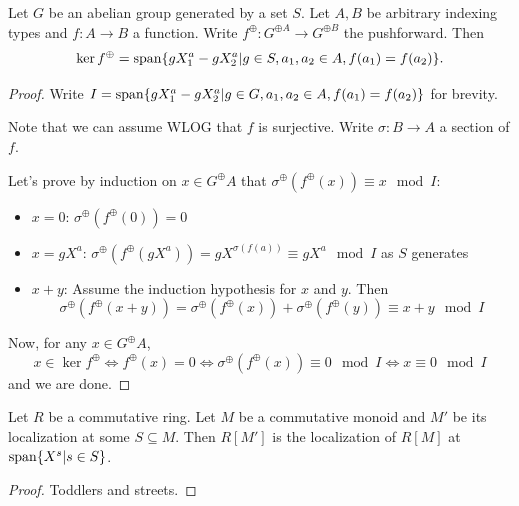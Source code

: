 \begin{proposition}
  \label{0-ker-mon-alg}
  \uses{}

  Let $G$ be an abelian group generated by a set $S$.
  Let $A, B$ be arbitrary indexing types and $f : A \to B$ a function.
  Write $f^\oplus : G^{\oplus A} \to G^{\oplus B}$ the pushforward.
  Then
  \[
    \ker f^\oplus = \operatorname{span}\{gX^a_1 - gX^a_2 | g \in S, a_1, a_2 \in A, f(a_1) = f(a_2)\}.
  \]
\end{proposition}
\begin{proof}
  \uses{}

  Write $I = \operatorname{span}\{gX^a_1 - gX^a_2 | g \in G, a_1, a_2 \in A, f(a_1) = f(a_2)\}$ for brevity.

  Note that we can assume WLOG that $f$ is surjective.
  Write $\sigma : B \to A$ a section of $f$.

  Let's prove by induction on $x \in G^\oplus A$ that $\sigma^\oplus(f^\oplus(x)) \equiv x \mod I$:
  \begin{itemize}
    \item $x = 0$: $\sigma^\oplus(f^\oplus(0)) = 0$
    \item $x = gX^a$:
      $\sigma^\oplus(f^\oplus(gX^a)) = gX^{\sigma(f(a))} \equiv gX^a \mod I$ as $S$ generates
    \item $x + y$: Assume the induction hypothesis for $x$ and $y$. Then
      \[
        \sigma^\oplus(f^\oplus(x + y)) = \sigma^\oplus(f^\oplus(x)) + \sigma^\oplus(f^\oplus(y))
          \equiv x + y \mod I
      \]
  \end{itemize}

  Now, for any $x \in G^\oplus A$,
  \[
    x \in \ker f^\oplus \iff f^\oplus(x) = 0 \iff
      \sigma^\oplus(f^\oplus(x)) \equiv 0 \mod I \iff x \equiv 0 \mod I
  \]
  and we are done.
\end{proof}


\begin{proposition}
  \label{0-loc-mon-alg}
  \uses{}

  Let $R$ be a commutative ring.
  Let $M$ be a commutative monoid and $M'$ be its localization at some $S \subseteq M$.
  Then $R[M']$ is the localization of $R[M]$ at $\operatorname{span} \{X^s | s \in S\}$.
\end{proposition}
\begin{proof}
  \uses{}

  Toddlers and streets.
\end{proof}


